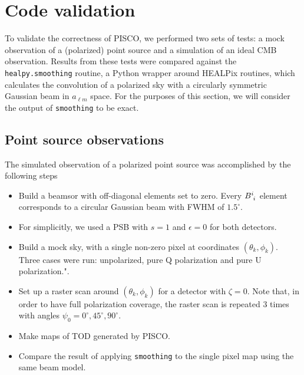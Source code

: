 \documentclass[a4paper,11pt]{article}
\begin{document}
%
\section{Code validation}
\label{sec::validation}

To validate the correctness of PISCO, we performed two sets of tests: a mock observation of a (polarized) point source and a simulation of an ideal CMB observation. Results from these tests were compared against the \texttt{healpy.smoothing} routine, a Python wrapper around HEALPix routines, which calculates the convolution of a polarized sky with a circularly symmetric Gaussian beam in $a_{\ell m}$ space. For the purposes of this section, we will consider the output of \texttt{smoothing} to be exact. 

\subsection{Point source observations}

The simulated observation of a polarized point source was accomplished by the following steps

\begin{itemize}
    \item Build a beamsor with off-diagonal elements set to zero. Every $\tensor{B}{^i_i}$ element corresponds to a circular Gaussian beam with FWHM of $1.5^\circ$. 
    \item For simplicitly, we used a PSB with $s=1$ and $\epsilon=0$ for both detectors.
	\item Build a mock sky, with a single non-zero pixel at coordinates $(\theta_k,\phi_k)$. Three cases were run: unpolarized, pure Q polarization and pure U polarization.".
	\item Set up a raster scan around $(\theta_k,\phi_k)$ for a detector with $\zeta=0$. Note that, in order to have full polarization coverage, the raster scan is repeated 3 times with angles $\psi_0 = 0^{\circ},45^{\circ},90^{\circ}$.
	\item Make maps of TOD generated by PISCO.
	\item Compare the result of applying \texttt{smoothing} to the single pixel map using the same beam model.
\end{itemize}
\end{document}
